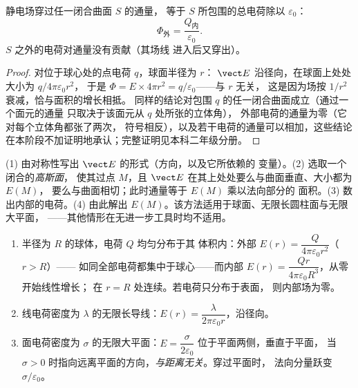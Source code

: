 \begin{theorem}[高斯定理]\label{thm:b1:electrostatics-gauss:gauss}
静电场穿过任一闭合曲面 $S$ 的通量，
等于 $S$ 所包围的总电荷除以 $\varepsilon_0$：
\[
\Phi_{\text{外}} = \frac{Q_{\text{内}}}{\varepsilon_0} .
\]
$S$ 之外的电荷对通量没有贡献（其场线
进入后又穿出）。
\end{theorem}

\begin{proof}
对位于球心处的点电荷 $q$，球面半径为 $r$：
$\vect E$ 沿径向，在球面上处处大小为 $q/4\pi\varepsilon_0r^2$，
于是 $\Phi = E \times 4\pi r^2 = q/\varepsilon_0$——与 $r$ 无关，
这是因为场按 $1/r^2$ 衰减，恰与面积的增长相抵。
同样的结论对包围 $q$ 的任一闭合曲面成立（通过一个面元的通量
只取决于该面元从 $q$ 处所张的立体角），
外部电荷的通量为零（它对每个立体角都张了两次，
符号相反），以及若干电荷的通量可以相加，这些结论
在本阶段不加证明地承认；完整证明见本科二年级分册。
\end{proof}

\begin{method}[使用高斯定理]\label{meth:b1:electrostatics-gauss:gauss}
(1) 由对称性写出 $\vect E$ 的形式（方向，以及它所依赖的
变量）。(2) 选取一个闭合的\emph{高斯面}，
使其过点 $M$，且 $\vect E$ 在其上处处要么与曲面垂直、大小都为 $E(M)$，
要么与曲面相切；此时通量等于 $E(M)$ 乘以法向部分的
面积。(3) 数出内部的电荷。(4) 由此解出
$E(M)$。该方法适用于球面、无限长圆柱面与无限大平面，
——其他情形在无进一步工具时均不适用。
\end{method}

\begin{proposition}[三种经典场]\label{prop:b1:electrostatics-gauss:three}
\begin{enumerate}
  \item 半径为 $R$ 的球体，电荷 $Q$ 均匀分布于其
        体积内：外部 $E(r) = \dfrac{Q}{4\pi\varepsilon_0r^2}$（$r > R$）——
        如同全部电荷都集中于球心——而内部 $E(r) =
        \dfrac{Qr}{4\pi\varepsilon_0R^3}$，从零开始线性增长；
        在 $r = R$ 处连续。若电荷只分布于表面，
        则内部场为零。
  \item 线电荷密度为 $\lambda$ 的无限长导线：$E(r) =
        \dfrac{\lambda}{2\pi\varepsilon_0 r}$，沿径向。
  \item 面电荷密度为 $\sigma$ 的无限大平面：$E = \dfrac{\sigma}{2\varepsilon_0}$
        位于平面两侧，垂直于平面，
        当 $\sigma > 0$ 时指向远离平面的方向，\emph{与距离无关}。穿过平面时，
        法向分量跃变 $\sigma/\varepsilon_0$。
\end{enumerate}
\end{proposition}

